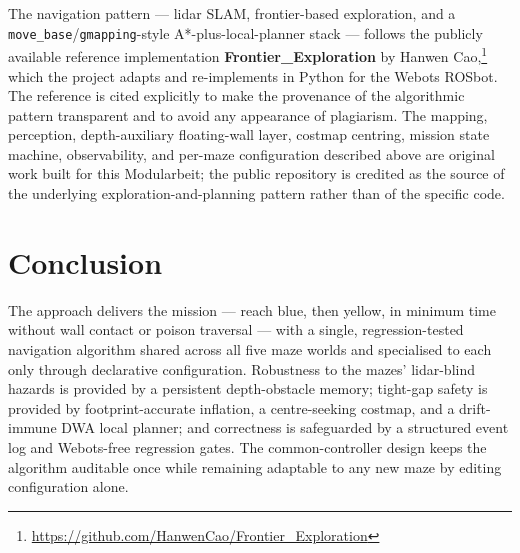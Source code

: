 \documentclass[11pt,a4paper]{article}
\newcommand{\code}[1]{\colorbox{codegray}{\texttt{\small #1}}}
\begin{document}
The navigation pattern --- lidar SLAM, frontier-based exploration, and a
\code{move\_base}/\code{gmapping}-style A*-plus-local-planner stack --- follows
the publicly available reference implementation
\textbf{Frontier\_Exploration} by Hanwen Cao,\footnote{\url{https://github.com/HanwenCao/Frontier_Exploration}}
which the project adapts and re-implements in Python for the Webots ROSbot. The
reference is cited explicitly to make the provenance of the algorithmic pattern
transparent and to avoid any appearance of plagiarism. The mapping, perception,
depth-auxiliary floating-wall layer, costmap centring, mission state machine,
observability, and per-maze configuration described above are original work
built for this Modularbeit; the public repository is credited as the source of
the underlying exploration-and-planning pattern rather than of the specific
code.

\section{Conclusion}

The approach delivers the mission --- reach blue, then yellow, in minimum time
without wall contact or poison traversal --- with a single, regression-tested
navigation algorithm shared across all five maze worlds and specialised to each
only through declarative configuration. Robustness to the mazes' lidar-blind
hazards is provided by a persistent depth-obstacle memory; tight-gap safety is
provided by footprint-accurate inflation, a centre-seeking costmap, and a
drift-immune DWA local planner; and correctness is safeguarded by a structured
event log and Webots-free regression gates. The common-controller design keeps
the algorithm auditable once while remaining adaptable to any new maze by
editing configuration alone.
\end{document}
